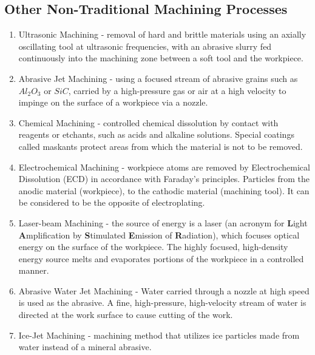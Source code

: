 \subsection{Other Non-Traditional Machining Processes}
\begin{enumerate}
\item Ultrasonic Machining - removal of hard and brittle materials using an axially oscillating tool at ultrasonic frequencies, with an abrasive slurry fed continuously into the machining zone between a soft tool and the workpiece.
\item Abrasive Jet Machining - using a focused stream of abrasive grains such as $Al_2O_3$ or $SiC$, carried by a high-pressure gas or air at a high velocity to impinge on the surface of a workpiece via a nozzle.
\item Chemical Machining - controlled chemical dissolution by contact with reagents or etchants, such as acids and alkaline solutions. Special coatings called maskants protect areas from which the material is not to be removed.
\item Electrochemical Machining - workpiece atoms are removed  by Electrochemical Dissolution (ECD) in accordance with Faraday's principles. Particles from the anodic material (workpiece), to the cathodic material (machining tool). It can be considered to be the opposite of electroplating.
\item Laser-beam Machining - the source of energy is a laser (an acronym for \textbf{L}ight \textbf{A}mplification by \textbf{S}timulated \textbf{E}mission of \textbf{R}adiation), which focuses optical energy on the surface of the workpiece. The highly focused, high-density energy source melts and evaporates portions of the workpiece in a controlled manner.
\item Abrasive Water Jet Machining - Water carried through a nozzle at high speed is used as the abrasive. A fine, high-pressure, high-velocity stream of water is directed at the work surface to cause cutting of the work.
\item Ice-Jet Machining - machining method that utilizes ice particles made from water instead of a mineral abrasive.
\end{enumerate}
